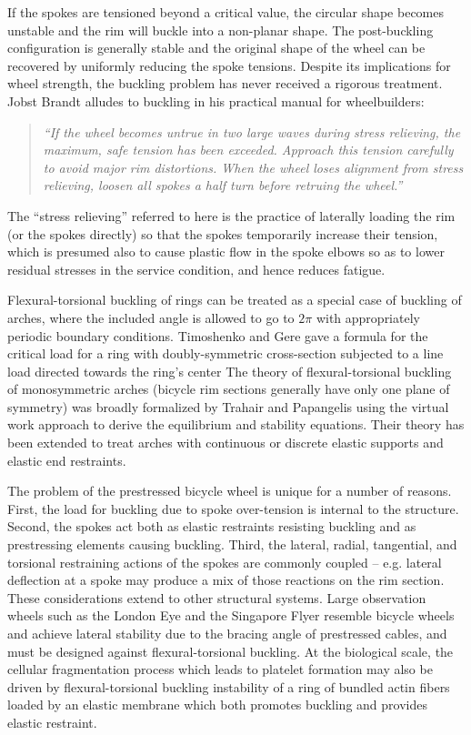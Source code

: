 \documentclass[\rootdir/thesis.tex]{subfiles}
\begin{document}
If the spokes are tensioned beyond a critical value, the circular shape becomes unstable and the rim will buckle into a non-planar shape. The post-buckling configuration is generally stable and the original shape of the wheel can be recovered by uniformly reducing the spoke tensions. Despite its implications for wheel strength, the buckling problem has never received a rigorous treatment. Jobst Brandt alludes to buckling in his practical manual for wheelbuilders\cite{Brandt}:

\begin{quote}
\emph{``If the wheel becomes untrue in two large waves during stress relieving, the maximum, safe tension has been exceeded. Approach this tension carefully to avoid major rim distortions. When the wheel loses alignment from stress relieving, loosen all spokes a half turn before retruing the wheel.''}
\end{quote}

The ``stress relieving'' referred to here is the practice of laterally loading the rim (or the spokes directly) so that the spokes temporarily increase their tension, which is presumed also to cause plastic flow in the spoke elbows so as to lower residual stresses in the service condition, and hence reduces fatigue.

Flexural-torsional buckling of rings can be treated as a special case of buckling of arches, where the included angle is allowed to go to $2\pi$ with appropriately periodic boundary conditions. Timoshenko and Gere\cite{TimoshenkoGere} gave a formula for the critical load for a ring with doubly-symmetric cross-section subjected to a line load directed towards the ring's center The theory of flexural-torsional buckling of monosymmetric arches (bicycle rim sections generally have only one plane of symmetry) was broadly formalized by Trahair and Papangelis\cite{Trahair} using the virtual work approach to derive the equilibrium and stability equations. Their theory has been extended to treat arches with continuous\cite{} or discrete\cite{} elastic supports and elastic end restraints\cite{}.

The problem of the prestressed bicycle wheel is unique for a number of reasons. First, the load for buckling due to spoke over-tension is internal to the structure. Second, the spokes act both as elastic restraints resisting buckling and as prestressing elements causing buckling. Third, the lateral, radial, tangential, and torsional restraining actions of the spokes are commonly coupled – e.g. lateral deflection at a spoke may produce a mix of those reactions on the rim section. These considerations extend to other structural systems. Large observation wheels such as the London Eye\cite{} and the Singapore Flyer\cite{} resemble bicycle wheels and achieve lateral stability due to the bracing angle of prestressed cables, and must be designed against flexural-torsional buckling. At the biological scale, the cellular fragmentation process which leads to platelet formation may also be driven by flexural-torsional buckling instability of a ring of bundled actin fibers loaded by an elastic membrane which both promotes buckling and provides elastic restraint\cite{}.
\end{document}
